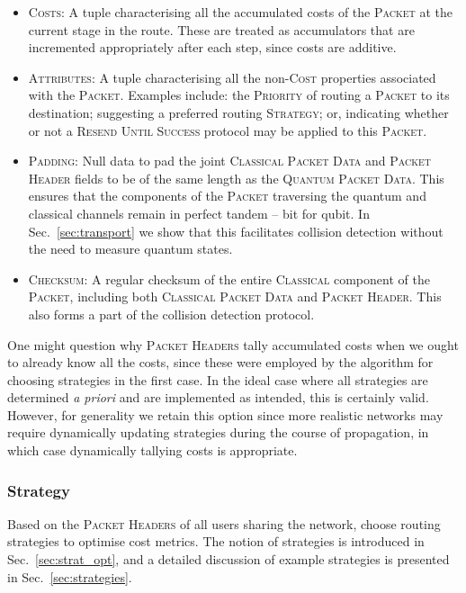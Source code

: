 \begin{itemize}
    \item \textsc{Costs}: A tuple characterising all the accumulated costs of the \textsc{Packet} at the current stage in the route. These are treated as accumulators that are incremented appropriately after each step, since costs are additive.
    \item \textsc{Attributes}: A tuple characterising all the non-\textsc{Cost} properties associated with the \textsc{Packet}. Examples include: the \textsc{Priority} of routing a \textsc{Packet} to its destination; suggesting a preferred routing \textsc{Strategy}; or, indicating whether or not a \textsc{Resend Until Success} protocol may be applied to this \textsc{Packet}.
    \item \textsc{Padding}: Null data to pad the joint \textsc{Classical Packet Data} and \textsc{Packet Header} fields to be of the same length as the \textsc{Quantum Packet Data}. This ensures that the components of the \textsc{Packet} traversing the quantum and classical channels remain in perfect tandem -- bit for qubit. In Sec.~\ref{sec:transport} we show that this facilitates collision detection without the need to measure quantum states.
    \item \textsc{Checksum}: A regular checksum of the entire \textsc{Classical} component of the \textsc{Packet}, including both \textsc{Classical Packet Data} and \textsc{Packet Header}. This also forms a part of the collision detection protocol.
\end{itemize}

One might question why \textsc{Packet Headers} tally accumulated costs when we ought to already know all the costs, since these were employed by the algorithm for choosing strategies in the first case. In the ideal case where all strategies are determined \textit{a priori} and are implemented as intended, this is certainly valid. However, for generality we retain this option since more realistic networks may require dynamically updating strategies during the course of propagation, in which case dynamically tallying costs is appropriate.

%
%

\subsubsection{Strategy} \label{sec:intro_strat} 

Based on the \textsc{Packet Headers} of all users sharing the network, choose routing strategies to optimise cost metrics. The notion of strategies is introduced in Sec.~\ref{sec:strat_opt}, and a detailed discussion of example strategies is presented in Sec.~\ref{sec:strategies}.

